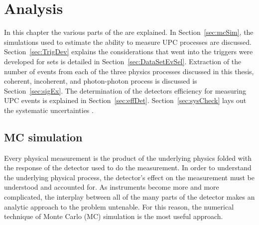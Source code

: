 \chapter{Analysis}
  In this chapter the various parts of the \DIFdelbegin {}\DIFdelend \DIFaddbegin {}\DIFaddend are explained. 
  \DIFdelbegin {}\DIFdelend In Section~\ref{sec:mcSim}, the simulations used to estimate the \DIFdelbegin {}\DIFdelend \DIFaddbegin {}\DIFaddend ability to measure UPC processes are discussed. 
  Section~\ref{sec:TrigDev} explains the considerations that went into the 
    triggers \DIFdelbegin {}\DIFdelend \DIFaddbegin {}\DIFaddend were developed for \DIFdelbegin {}\DIFdelend \DIFaddbegin {}\DIFaddend sets is detailed in 
    Section~\ref{sec:DataSetEvSel}.
  Extraction of the number of events from each of the three physics processes 
    discussed in this thesis, coherent, incoherent, and photon-photon process
    \DIFdelbegin {}\DIFdelend is discussed is Section~\ref{sec:sigEx}.
  The determination of the detectors efficiency for measuring UPC events is 
    explained in Section~\ref{sec:effDet}.
  \DIFaddbegin {}\DIFaddend Section~\ref{sec:sysCheck} lays out \DIFdelbegin {}\DIFdelend the systematic uncertainties 
    \DIFdelbegin {}\DIFdelend \DIFaddbegin {}\DIFaddend .

  \section{\label{sec:mcSim} MC simulation}
    Every physical measurement is the product of the underlying physics 
      folded with the response of the detector used to do the measurement. 
    In order to understand the underlying physical process, the detector's 
      effect on the measurement must be understood and accounted for. 
    As instruments become more and more complicated, the interplay between all
      of the many parts of the detector makes an analytic approach to the 
      problem untenable.
    For this reason, the numerical technique of Monte Carlo (MC) simulation is
      the most useful approach.

